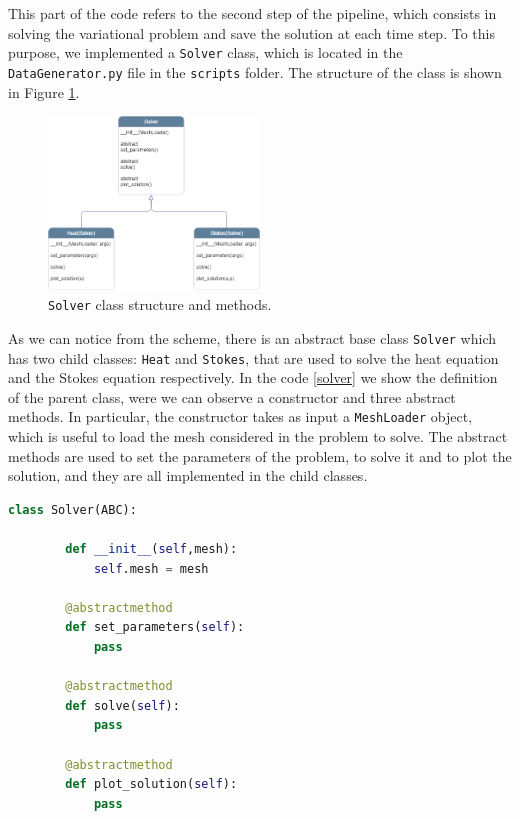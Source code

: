 \documentclass[11pt,a4paper]{article}
\begin{document}
This part of the code refers to the second step of the pipeline, which consists in solving the variational problem and save the solution at each time step.
To this purpose, we implemented a \texttt{Solver} class, which is located in the \texttt{DataGenerator.py} file in the \texttt{scripts} folder. The structure of the class is shown in Figure \ref{solver_class}. 

\begin{figure}[H]
    \centering
    \includegraphics[width=0.5\textwidth]{Images/solver_class.png}
    \caption{\texttt{Solver} class structure and methods.}
    \label{solver_class}
\end{figure}

As we can notice from the scheme, there is an abstract base class \texttt{Solver} which has two child classes: \texttt{Heat} and \texttt{Stokes}, that are used to solve the heat equation and the Stokes equation respectively. 
In the code \ref{solver} we show the definition of the parent class, were we can observe a constructor and three abstract methods. In particular, the constructor takes as input a \texttt{MeshLoader} object, which is useful to load the mesh considered in the problem to solve. The abstract methods are used to set the parameters of the problem, to solve it and to plot the solution, and they are all implemented in the child classes.

\begin{lstlisting}[language=Python, caption={Solver class.}, label={solver}]
    class Solver(ABC):
    
        def __init__(self,mesh):
            self.mesh = mesh

        @abstractmethod 
        def set_parameters(self):
            pass 

        @abstractmethod 
        def solve(self):
            pass 

        @abstractmethod 
        def plot_solution(self):
            pass
\end{lstlisting}
\end{document}
